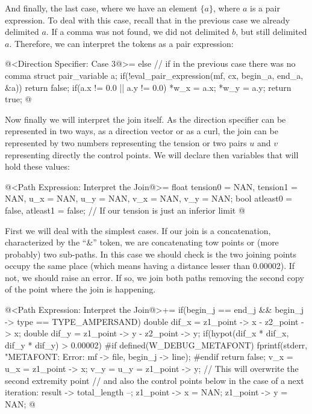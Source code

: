 And finally, the last case, where we have an element $\{a\}$, where
$a$ is a pair expression. To deal with this case, recall that in the
previous case we already delimited $a$. If a comma was not found, we
did not delimited $b$, but still delimited $a$. Therefore, we can
interpret the tokens as a pair expression:

\iniciocodigo
@<Direction Specifier: Case 3@>=
else{ // if in the previous case there was no comma
  struct pair_variable a;
  if(!eval_pair_expression(mf, cx, begin_a, end_a, &a))
    return false;
  if(a.x != 0.0 || a.y != 0.0){
    *w_x = a.x;
    *w_y = a.y;
  }
  return true;
}
@
\fimcodigo

Now finally we will interpret the join itself. As the direction
specifier can be represented in two ways, as a direction vector or as
a curl, the join can be represented by two numbers representing the
tension or two pairs $u$ and $v$ representing directly the control
points. We will declare then variables that will hold these values:

\iniciocodigo
@<Path Expression: Interpret the Join@>=
float tension0 = NAN, tension1 = NAN, u_x = NAN, u_y = NAN, v_x = NAN,
      v_y = NAN;
bool atleast0 = false, atleast1 = false; // If our tension is just an inferior limit
@
\fimcodigo

First we will deal with the simplest cases. If our join is a
concatenation, characterized by the ``\&'' token, we are concatenating
tow points or (more probably) two sub-paths. In this case we should
check is the two joining points occupy the same place (which means
having a distance lesser than 0.00002). If not, we should raise an
error. If so, we join both paths removing the second copy of the point
where the join is happening.

\iniciocodigo
@<Path Expression: Interpret the Join@>+=
if(begin_j == end_j && begin_j -> type == TYPE_AMPERSAND){
  double dif_x = z1_point -> x - z2_point -> x;
  double dif_y = z1_point -> y - z2_point -> y;
  if(hypot(dif_x * dif_x, dif_y * dif_y) > 0.00002){
#if defined(W_DEBUG_METAFONT)
    fprintf(stderr,
            "METAFONT: Error: %
            mf -> file, begin_j -> line);
#endif
    return false;
  }
  v_x = u_x = z1_point -> x;
  v_y = u_y = z1_point -> y;
  // This will overwrite the second extremity point
  // and also the control points below in the case of a next iteration:
  result -> total_length --;
  z1_point -> x = NAN;
  z1_point -> y = NAN;
}
@
\fimcodigo

